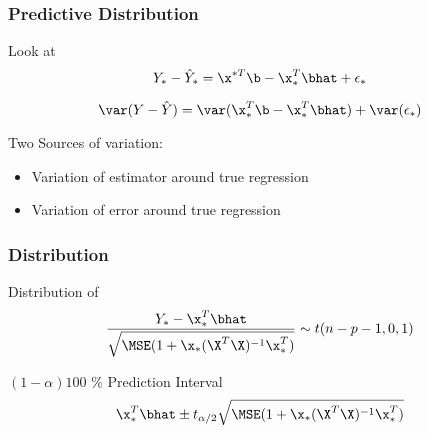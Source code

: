 \documentclass[handout]{beamer}
\begin{document}
\begin{frame}\frametitle{Predictive Distribution}
Look at  
 $$Y_* -\hat{Y}_*  = \x^{*T} \b - \x_*^T\bhat + \epsilon_*$$ \pause

 $$\var(Y -\hat{Y})  = \var(\x_*^{T} \b - \x_*^T\bhat) +
 \var(\epsilon_*)$$ \pause

\vfill
Two Sources of variation:
\begin{itemize}
\item Variation of estimator around true regression \pause
\item Variation of error around true regression \pause
\end{itemize}
\end{frame}
\begin{frame}\frametitle{Distribution}
Distribution of 
$$ \frac{Y_* - \x_*^T\bhat}{
\sqrt{\MSE (1 + \x_*(\X^T\X)^{-1}\x_*^T)}} \sim t(n - p - 1, 0, 1)
$$  
\vfill

$(1 - \alpha) 100$ \% Prediction Interval 
 $$\x_*^T \bhat \pm  t_{\alpha/2} \sqrt{\MSE (1 + \x_*(\X^T\X)^{-1}\x_*^T)}$$
\end{frame}
\end{document}
